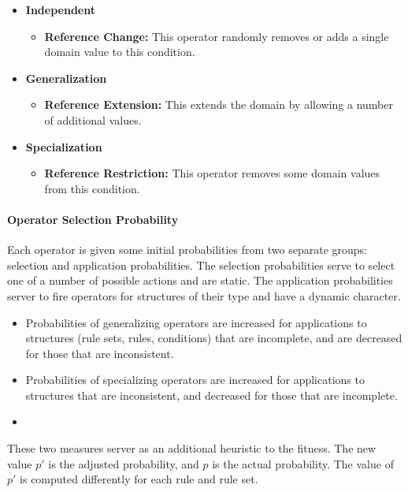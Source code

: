 \documentclass[../main.tex]{subfiles}
\begin{document}
\begin{itemize}
	\item \textbf{Independent}
	\begin{itemize}
		\item \textbf{Reference Change:} This operator randomly removes or adds a single domain value to this
		condition.
	\end{itemize}
	\item \textbf{Generalization}
		\begin{itemize}
		\item \textbf{Reference Extension:} This extends the domain by allowing a number of additional values.
	\end{itemize}
	\item \textbf{Specialization}
	\begin{itemize}
		\item \textbf{Reference Restriction:} This operator removes some domain values from this condition.
	\end{itemize}
\end{itemize}

\paragraph{Operator Selection Probability}
Each operator is given some initial probabilities from two separate groups: selection and application probabilities.
The selection probabilities serve to select one of a number of possible actions and are static. The application
probabilities server to fire operators for structures of their type and have a dynamic character.

\begin{itemize}
	\item Probabilities of generalizing operators are increased for applications to structures (rule sets, rules,
	conditions) that are incomplete, and are decreased for those that are inconsistent.
	\item Probabilities of specializing operators are increased for applications to structures that are inconsistent,
	and decreased for those that are incomplete.
	\item
\end{itemize}

These two measures server as an additional heuristic to the fitness. The new value $p'$ is the adjusted probability,
and $p$ is the actual probability. The value of $p'$ is computed differently for each rule and rule set.
\end{document}
